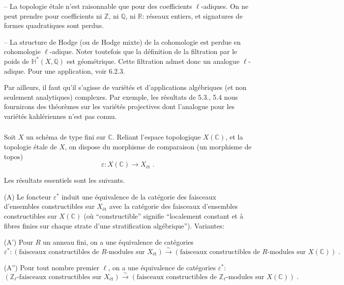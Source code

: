 \documentclass[12pt,a4paper]{article}
\theoremstyle{plain}
\theoremstyle{definition}
\theoremstyle{remark}
\newcommand{\CC}{\mathbb{C}}
\newcommand{\HH}{\mathbb{H}}
\newcommand{\QQ}{\mathbb{Q}}
\newcommand{\RR}{\mathbb{R}}
\newcommand{\ZZ}{\mathbb{Z}}
\begin{document}
-- La topologie \'etale n'est raisonnable que pour des coefficients $\ell$-adiques. On ne peut prendre pour coefficients ni $\ZZ$, ni $\QQ$, ni $\RR$: r\'eseaux entiers, et signatures de formes quadratiques sont perdus.

-- La structure de Hodge (ou de Hodge mixte) de la cohomologie est perdue en cohomologie $\ell$-adique. Noter toutefois que la d\'efinition de la filtration par le poids de $\HH^*(X, \QQ)$ est g\'eom\'etrique. Cette filtration admet donc un analogue $\ell$-adique. Pour une application, voir 6.2.3.

Par ailleurs, il faut qu'il s'agisse de vari\'et\'es et d'applications alg\'ebriques (et non seulement analytiques) complexes. Par exemple, les r\'esultats de 5.3., 5.4 nous fournirons des th\'eor\`emes sur les vari\'et\'es projectives dont l'analogue pour les vari\'et\'es kahl\'eriennes n'est pas connu.

\subsubsection{}
Soit $X$ un sch\'ema de type fini sur $\CC$. Reliant l'espace topologique $X(\CC)$, et la topologie \'etale de $X$, on dispose du morphisme de comparaison (un morphisme de topos)
\[
\varepsilon: X(\CC) \longrightarrow X_{\text{\'et}}\;.
\]

Les r\'esultats essentiels sont les suivants.

\medskip
(A) Le foncteur $\varepsilon^*$ induit une \'equivalence de la cat\'egorie des faisceaux d'ensembles constructibles sur $X_{\text{\'et}}$ avec la cat\'egorie des faisceaux d'ensembles constructibles sur $X(\CC)$ (o\`u ``constructible'' signifie ``localement constant et \`a fibres finies sur chaque strate d'une stratification alg\'ebrique''). Variantes:

\medskip
(A') Pour $R$ un anneau fini, on a une \'equivalence de cat\'egories
\[
\varepsilon^*: (\text{faisceaux constructibles de } R\text{-modules sur } X_{\text{\'et}}) \xrightarrow{\sim} (\text{faisceaux constructibles de } R\text{-modules sur } X(\CC))\;.
\]

(A'') Pour tout nombre premier $\ell$, on a une \'equivalence de cat\'egories $\varepsilon^*$:
\[
(\ZZ_{\ell}\text{-faisceaux constructibles sur } X_{\text{\'et}}) \xrightarrow{\sim} (\text{faisceaux constructibles de } \ZZ_{\ell}\text{-modules sur } X(\CC))\;.
\]
\end{document}
